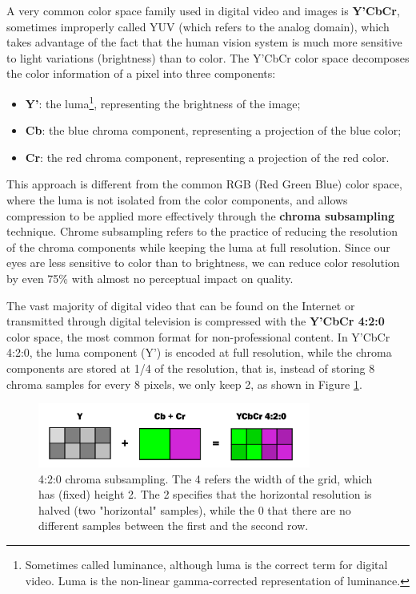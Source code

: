 A very common color space family used in digital video and images is \textbf{Y'CbCr}, sometimes improperly called YUV (which refers to the analog domain), which takes advantage of the fact that the human vision system is much more sensitive to light variations (brightness) than to color. The Y'CbCr color space decomposes the color information of a pixel into three components:

\begin{itemize}
    \item \textbf{Y'}: the luma\footnote{Sometimes called luminance, although luma is the correct term for digital video. Luma is the non-linear gamma-corrected representation of luminance.}, representing the brightness of the image;
    \item \textbf{Cb}: the blue chroma component, representing a projection of the blue color;
    \item \textbf{Cr}: the red chroma component, representing a projection of the red color.
\end{itemize}

This approach is different from the common RGB (Red Green Blue) color space, where the luma is not isolated from the color components, and allows compression to be applied more effectively through the \textbf{chroma subsampling} technique. Chrome subsampling refers to the practice of reducing the resolution of the chroma components while keeping the luma at full resolution. Since our eyes are less sensitive to color than to brightness, we can reduce color resolution by even 75\% with almost no perceptual impact on quality.

The vast majority of digital video that can be found on the Internet or transmitted through digital television is compressed with the \textbf{Y'CbCr 4:2:0} color space, the most common format for non-professional content. In Y'CbCr 4:2:0, the luma component (Y') is encoded at full resolution, while the chroma components are stored at 1/4 of the resolution, that is, instead of storing 8 chroma samples for every 8 pixels, we only keep 2, as shown in Figure \ref{fig:yuv420}.

\begin{figure}[h]
	\centering
	\includegraphics[width=0.8\textwidth]{res/yuv420.png}
	\caption{4:2:0 chroma subsampling. The 4 refers the width of the grid, which has (fixed) height 2. The 2 specifies that the horizontal resolution is halved (two "horizontal" samples), while the 0 that there are no different samples between the first and the second row.}
	\label{fig:yuv420}
\end{figure}


